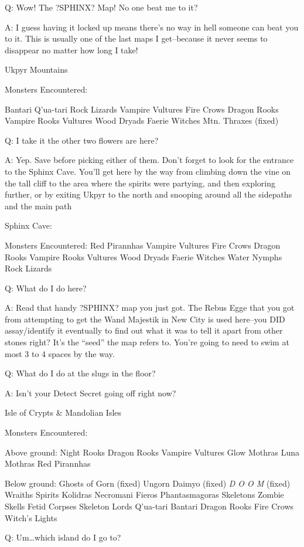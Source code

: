 \documentclass[12pt]{article}
\begin{document}
Q: Wow! The ?SPHINX? Map! No one beat me to it?

A: I guess having it locked up means there's no way in hell someone can
beat you to it. This is usually one of the last maps I get--because it
never seems to disappear no matter how long I take!

Ukpyr Mountains

Monsters Encountered:

Bantari Q'ua-tari Rock Lizards Vampire Vultures Fire Crows Dragon Rooks
Vampire Rooks Vultures Wood Dryads Faerie Witches Mtn. Thraxes (fixed)

Q: I take it the other two flowers are here?

A: Yep. Save before picking either of them. Don't forget to look for the
entrance to the Sphinx Cave. You'll get here by the way from climbing
down the vine on the tall cliff to the area where the spirits were
partying, and then exploring further, or by exiting Ukpyr to the north
and snooping around all the sidepaths and the main path

Sphinx Cave:

Monsters Encountered: Red Pirannhas Vampire Vultures Fire Crows Dragon
Rooks Vampire Rooks Vultures Wood Dryads Faerie Witches Water Nymphs
Rock Lizards

Q: What do I do here?

A: Read that handy ?SPHINX? map you just got. The Rebus Egge that you
got from attempting to get the Wand Majestik in New City is used
here--you DID assay/identify it eventually to find out what it was to
tell it apart from other stones right? It's the ``seed'' the map refers
to. You're going to need to swim at most 3 to 4 spaces by the way.

Q: What do I do at the slugs in the floor?

A: Isn't your Detect Secret going off right now?

Isle of Crypts \& Mandolian Isles

Monsters Encountered:

Above ground: Night Rooks Dragon Rooks Vampire Vultures Glow Mothras
Luna Mothras Red Pirannhas

Below ground: Ghosts of Gorn (fixed) Ungorn Daimyo (fixed) \emph{D O O
M} (fixed) Wraiths Spirits Kolidras Necromani Fieros Phantasmagoras
Skeletons Zombie Skells Fetid Corpses Skeleton Lords Q'ua-tari Bantari
Dragon Rooks Fire Crows Witch's Lights

Q: Um\ldots{}which island do I go to?
\end{document}
